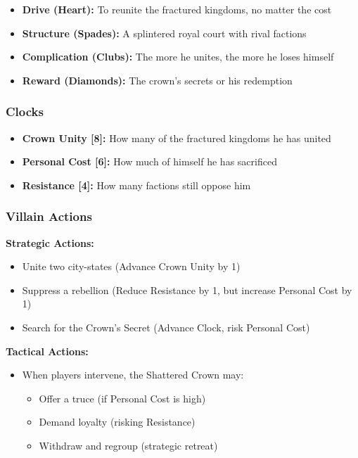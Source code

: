 \begin{itemize}
  \item \textbf{Drive (Heart):} To reunite the fractured kingdoms, no matter the cost
  \item \textbf{Structure (Spades):} A splintered royal court with rival factions
  \item \textbf{Complication (Clubs):} The more he unites, the more he loses himself
  \item \textbf{Reward (Diamonds):} The crown's secrets or his redemption
\end{itemize}

\subsubsection{Clocks}

\begin{itemize}
  \item \textbf{Crown Unity [8]:} How many of the fractured kingdoms he has united
  \item \textbf{Personal Cost [6]:} How much of himself he has sacrificed
  \item \textbf{Resistance [4]:} How many factions still oppose him
\end{itemize}

\subsubsection{Villain Actions}

\textbf{Strategic Actions:}
\begin{itemize}
  \item Unite two city-states (Advance Crown Unity by 1)
  \item Suppress a rebellion (Reduce Resistance by 1, but increase Personal Cost by 1)
  \item Search for the Crown's Secret (Advance Clock, risk Personal Cost)
\end{itemize}

\textbf{Tactical Actions:}
\begin{itemize}
  \item When players intervene, the Shattered Crown may:
    \begin{itemize}
      \item Offer a truce (if Personal Cost is high)
      \item Demand loyalty (risking Resistance)
      \item Withdraw and regroup (strategic retreat)
    \end{itemize}
\end{itemize}

